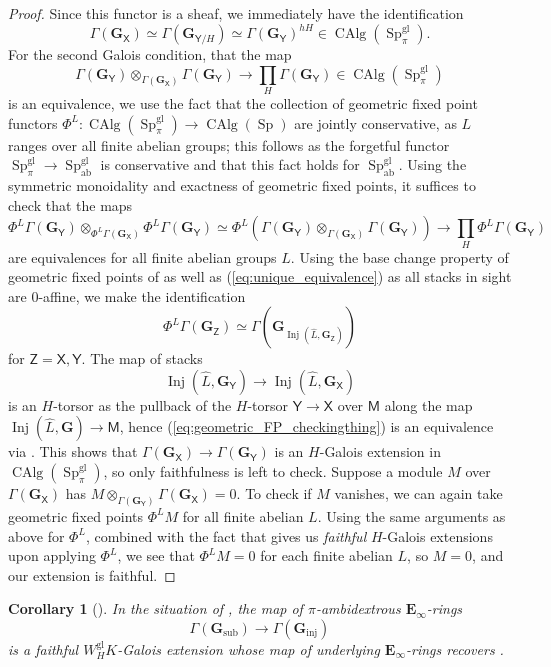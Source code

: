 \documentclass[11pt, a4paper]{article}
\newcommand{\ab}{\mathrm{ab}}
\newcommand{\gl}{\mathrm{gl}}
\newcommand{\inj}{\mathrm{inj}}
\newcommand{\sub}{\mathrm{sub}}
\newcommand{\1}{\mathbf{1}}
\DeclareMathOperator{\CAlg}{CAlg}
\DeclareMathOperator{\Inj}{Inj}
\DeclareMathOperator{\Sp}{Sp}
\newcommand{\dual}[1]{{\widehat{#1}}}
\newcommand{\E}{\mathbf{E}}
\newcommand{\G}{\mathbf{G}}
\newcommand{\M}{\mathsf{M}}
\newcommand{\X}{\mathsf{X}}
\newcommand{\Y}{\mathsf{Y}}
\newcommand{\sfZ}{\mathsf{Z}}
\newcommand{\Ga}{\Gamma}
\theoremstyle{plain}
\newtheorem{cor}[equation]{Corollary}
\theoremstyle{definition}
\theoremstyle{remark}\numberwithin{equation}{section}
\begin{document}
\begin{proof}
    Since this functor is a sheaf, we immediately have the identification
    \[\Ga(\G_\X) \simeq \Ga(\G_{\Y/H}) \simeq \Ga(\G_\Y)^{hH} \in \CAlg(\Sp^\gl_\pi).\]
    For the second Galois condition, that the map
    \[\Ga(\G_\Y)\otimes_{\Ga(\G_\X)} \Ga(\G_\Y) \to \prod_H \Ga(\G_\Y) \in \CAlg(\Sp^\gl_\pi)\]
    is an equivalence, we use the fact that the collection of geometric fixed point functors $\Phi^L \colon \CAlg(\Sp^\gl_\pi) \to \CAlg(\Sp)$ are jointly conservative, as $L$ ranges over all finite abelian groups; this follows as the forgetful functor $\Sp^\gl_\pi \to \Sp^\gl_\ab$ is conservative and that this fact holds for $\Sp_\ab^\gl$. Using the symmetric monoidality and exactness of geometric fixed points, it suffices to check that the maps
    \begin{equation}\label{eq:geometric_FP_checkingthing}\Phi^L \Ga(\G_\Y)\otimes_{\Phi^L \Ga(\G_\X)} \Phi^L \Ga(\G_\Y) \simeq \Phi^L\left(\Ga(\G_\Y)\otimes_{\Ga(\G_\X)} \Ga(\G_\Y)\right) \to \prod_H \Phi^L \Ga(\G_\Y)\end{equation}
    are equivalences for all finite abelian groups $L$. Using the base change property of geometric fixed points of \cite[Thm.E]{temperedglobal} as well as (\ref{eq:unique_equivalence}) as all stacks in sight are $0$-affine, we make the identification
    \[\Phi^L \Ga(\G_\sfZ) \simeq \Ga(\G_{\Inj(\dual{L}, \G_\sfZ)})\]
    for $\sfZ=\X,\Y$. The map of stacks
    \[\Inj(\dual{L}, \G_\Y) \to \Inj(\dual{L}, \G_\X)\]
    is an $H$-torsor as the pullback of the $H$-torsor $\Y \to \X$ over $\M$ along the map $\Inj(\dual{L}, \G) \to \M$, hence (\ref{eq:geometric_FP_checkingthing}) is an equivalence via . This shows that $\Ga(\G_\X) \to \Ga(\G_\Y)$ is an $H$-Galois extension in $\CAlg(\Sp^\gl_\pi)$, so only faithfulness is left to check. Suppose a module $M$ over $\Ga(\G_\X)$ has $M \otimes_{\Ga(\G_\Y)}\Ga(\G_\X) = 0$. To check if $M$ vanishes, we can again take geometric fixed points $\Phi^L M$ for all finite abelian $L$. Using the same arguments as above for $\Phi^L$, combined with the fact that  gives us \emph{faithful} $H$-Galois extensions upon applying $\Phi^L$, we see that $\Phi^L M=0$ for each finite abelian $L$, so $M=0$, and our extension is faithful.
\end{proof}

\begin{cor}[{}]\label{cor:globalisations}
    In the situation of , the map of $\pi$-ambidextrous $\E_\infty$-rings
    \[\Ga({\G_\sub}) \to \Ga({\G_\inj})\]
    is a faithful $W_H^\gl K$-Galois extension whose map of underlying $\E_\infty$-rings recovers .
\end{cor}
\end{document}
